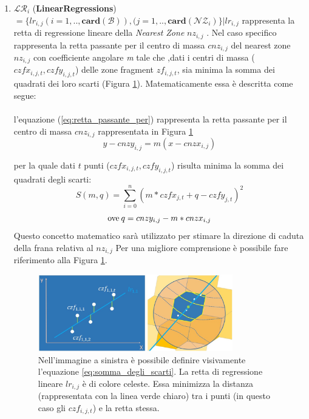 \begin{enumerate}
	\item \textbf{$ \mathcal{LR}_i $} (\textbf{LinearRegressions}) $ = \{lr_{i,j}(i=1,..,\mathbf{card}(\mathcal{B})),(j=1,..,\mathbf{card}(\mathcal{NZ}_i)\} | lr_{i,j} $ rappresenta la retta di regressione lineare della \textit{Nearest Zone} $nz_{i,j}$ . Nel caso specifico rappresenta la retta passante per il centro di massa $cnz_{i,j}$ del nearest zone $nz_{i,j}$ con coefficiente angolare \textit{m} tale che ,dati i centri di massa ($czfx_{i,j,t}, czfy_{i,j,t}$)  delle zone fragment $zf_{i,j,t}$,  sia minima la somma dei quadrati dei loro scarti (Figura \ref{linear_regression}). Matematicamente essa è descritta come segue:\\
	\\
	l'equazione (\ref{eq:retta_passante_per}) rappresenta la retta passante per il centro di massa $cnz_{i,j}$ rappresentata in Figura \ref{linear_regression}
	\begin{equation}\label{eq:retta_passante_per}
		y - cnzy_{i,j} = m(x-cnzx_{i,j})
	\end{equation}
	
	per la quale dati $t$ punti ($czfx_{i,j,t}, czfy_{i,j,t}$) risulta minima la somma dei quadrati degli scarti:
	\begin{equation}\label{eq:somma_degli_scarti}
		S(m, q) = \sum_{i=0}^n (m*czfx_{j,t} + q - czfy_{j,t})^2 
	\end{equation}
	\begin{equation}
		\textnormal{ove}\: q = cnzy_{i,j} - m*cnzx_{i,j}
	\end{equation}
	Questo concetto matematico sarà utilizzato per stimare la direzione di caduta della frana relativa al $nz_{i,j}$
	Per una migliore comprensione è possibile fare riferimento alla Figura \ref{linear_regression}.
	
	
	\begin{figure}[h]
		\centering
		\includegraphics[width=0.8\textwidth]{images/linear_regression}
		\caption{Nell'immagine a sinistra è possibile definire visivamente l'equazione \ref{eq:somma_degli_scarti}. La retta di regressione lineare $lr_{i,j}$ è di colore celeste. Essa minimizza la distanza (rappresentata con la linea verde chiaro) tra i punti (in questo caso gli $czf_{i,j,t}$) e la retta stessa.}
		\label{linear_regression}
	\end{figure}
	

\end{enumerate}
